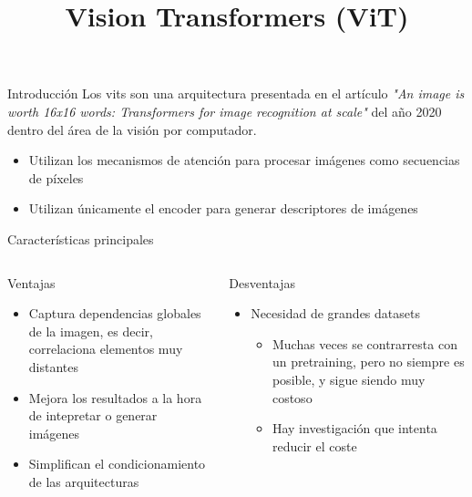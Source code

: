 



\title{Vision Transformers (ViT)}


\maketitle

\begin{frame}{Introducción}
Los \glspl{vit} son una arquitectura presentada en el artículo \textit{"An image is worth 16x16 words: Transformers for image recognition at scale"} del año 2020 \cite{dosovitskiy2020image} dentro del área de la \alert{visión por computador}.

\begin{itemize}
    \item Utilizan los mecanismos de \alert{atención} para procesar imágenes como \alert{secuencias de píxeles}
    \item Utilizan únicamente el \alert{encoder} para generar \alert{descriptores} de imágenes
\end{itemize}
\end{frame}

\begin{frame}{Características principales}
\begin{columns}[c]
\centering
\begin{column}{0.45\textwidth}
\alert{\Large Ventajas}
\begin{itemize}
    \item Captura \alert{dependencias globales} de la imagen, es decir, correlaciona elementos muy distantes
    \item Mejora los resultados a la hora de intepretar o generar imágenes
    \item Simplifican el \alert{condicionamiento} de las arquitecturas
\end{itemize}
\end{column}
\centering
\begin{column}{0.45\textwidth}
\alert{\Large Desventajas}
\begin{itemize}
    \item Necesidad de \alert{grandes datasets}
    \begin{itemize}
        \item Muchas veces se contrarresta con un \alert{pretraining}, pero no siempre es posible, y sigue siendo muy costoso
        \item Hay investigación que intenta reducir el coste \cite{yuan2021tokens}
    \end{itemize}
\end{itemize}
\end{column}
\end{columns}
\end{frame}

